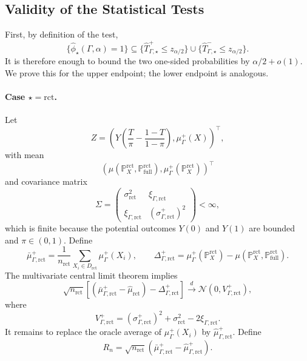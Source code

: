 \subsection{Validity of the Statistical Tests}
\label{app:confounding-proof-tests}

First, by definition of the test,
\[
  \{\widehat{\phi}_{\star}(\Gamma,\alpha)=1\}
  \subseteq
  \{\widehat{T}^+_{\Gamma,\star}\leq z_{\alpha/2}\}
  \cup
  \{\widehat{T}^-_{\Gamma,\star}\leq z_{\alpha/2}\}.
\]
It is therefore enough to bound the two one-sided probabilities by \(\alpha/2+o(1)\). We prove this for the upper endpoint; the lower endpoint is analogous.

\paragraph{Case \(\star=\mathrm{rct}\).}
Let
\[
  Z
  =
  \left(
    Y\left(\frac{T}{\pi}-\frac{1-T}{1-\pi}\right),
    \mu^+_{\Gamma}(X)
  \right)^{\top},
\]
with mean
\[
  \left(
    \mu(\mathbb{P}^{\mathrm{rct}}_X,\mathbb{P}^{\mathrm{rct}}_{\mathrm{full}}),
    \mu^+_{\Gamma}(\mathbb{P}^{\mathrm{rct}}_X)
  \right)^{\top}
\]
and covariance matrix
\[
  \Sigma
  =
  \begin{pmatrix}
    \sigma_{\mathrm{rct}}^2 & \xi_{\Gamma,\mathrm{rct}} \\
    \xi_{\Gamma,\mathrm{rct}} & (\sigma^+_{\Gamma,\mathrm{rct}})^2
  \end{pmatrix}
  < \infty,
\]
which is finite because the potential outcomes \(Y(0)\) and \(Y(1)\) are bounded and \(\pi\in(0,1)\). Define
\[
  \bar{\mu}^+_{\Gamma,\mathrm{rct}}
  =
  \frac{1}{n_{\mathrm{rct}}}
  \sum_{X_i\in D_{\mathrm{rct}}}
  \mu^+_{\Gamma}(X_i),
  \qquad
  \Delta^+_{\Gamma,\mathrm{rct}}
  =
  \mu^+_{\Gamma}(\mathbb{P}^{\mathrm{rct}}_X)
  -
  \mu(\mathbb{P}^{\mathrm{rct}}_X,\mathbb{P}^{\mathrm{rct}}_{\mathrm{full}}).
\]
The multivariate central limit theorem implies
\[
  \sqrt{n_{\mathrm{rct}}}
  \left[
    \left(
      \bar{\mu}^+_{\Gamma,\mathrm{rct}}
      -\widehat{\mu}_{\mathrm{rct}}
    \right)
    -
    \Delta^+_{\Gamma,\mathrm{rct}}
  \right]
  \xrightarrow{d}
  \mathcal{N}
  \left(0,V^+_{\Gamma,\mathrm{rct}}\right),
\]
where
\[
  V^+_{\Gamma,\mathrm{rct}}
  =
  (\sigma^+_{\Gamma,\mathrm{rct}})^2
  +
  \sigma_{\mathrm{rct}}^2
  -
  2\xi_{\Gamma,\mathrm{rct}}.
\]
It remains to replace the oracle average of \(\mu^+_{\Gamma}(X_i)\) by \(\widehat{\mu}^+_{\Gamma,\mathrm{rct}}\). Define
\[
  R_n
  =
  \sqrt{n_{\mathrm{rct}}}
  \left(
    \bar{\mu}^+_{\Gamma,\mathrm{rct}}
    -\widehat{\mu}^+_{\Gamma,\mathrm{rct}}
  \right).
\]
